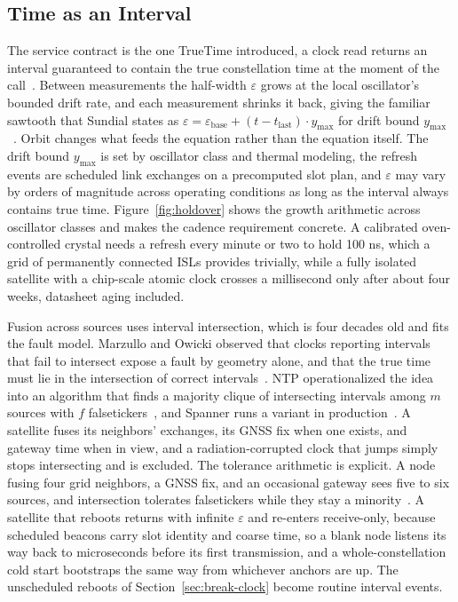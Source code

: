 \documentclass[twocolumn,10pt]{article}
\begin{document}
\subsection{Time as an Interval}\label{sec:interval}
The service contract is the one TrueTime introduced, a clock read returns an interval guaranteed to contain the true constellation time at the moment of the call~\cite{corbett2012}. Between measurements the half-width $\varepsilon$ grows at the local oscillator's bounded drift rate, and each measurement shrinks it back, giving the familiar sawtooth that Sundial states as $\varepsilon = \varepsilon_{\mathrm{base}} + (t - t_{\mathrm{last}})\cdot y_{\max}$ for drift bound $y_{\max}$~\cite{li2020}. Orbit changes what feeds the equation rather than the equation itself. The drift bound $y_{\max}$ is set by oscillator class and thermal modeling, the refresh events are scheduled link exchanges on a precomputed slot plan, and $\varepsilon$ may vary by orders of magnitude across operating conditions as long as the interval always contains true time. Figure~\ref{fig:holdover} shows the growth arithmetic across oscillator classes and makes the cadence requirement concrete. A calibrated oven-controlled crystal needs a refresh every minute or two to hold 100 ns, which a grid of permanently connected ISLs provides trivially, while a fully isolated satellite with a chip-scale atomic clock crosses a millisecond only after about four weeks, datasheet aging included.

Fusion across sources uses interval intersection, which is four decades old and fits the fault model. Marzullo and Owicki observed that clocks reporting intervals that fail to intersect expose a fault by geometry alone, and that the true time must lie in the intersection of correct intervals~\cite{marzullo1983}. NTP operationalized the idea into an algorithm that finds a majority clique of intersecting intervals among $m$ sources with $f$ falsetickers~\cite{rfc5905}, and Spanner runs a variant in production~\cite{corbett2012}. A satellite fuses its neighbors' exchanges, its GNSS fix when one exists, and gateway time when in view, and a radiation-corrupted clock that jumps simply stops intersecting and is excluded. The tolerance arithmetic is explicit. A node fusing four grid neighbors, a GNSS fix, and an occasional gateway sees five to six sources, and intersection tolerates falsetickers while they stay a minority~\cite{rfc5905}. A satellite that reboots returns with infinite $\varepsilon$ and re-enters receive-only, because scheduled beacons carry slot identity and coarse time, so a blank node listens its way back to microseconds before its first transmission, and a whole-constellation cold start bootstraps the same way from whichever anchors are up. The unscheduled reboots of Section~\ref{sec:break-clock} become routine interval events.
\end{document}
